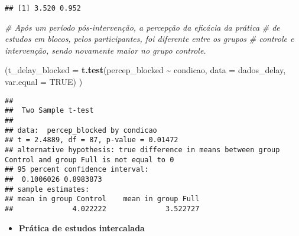 \documentclass[
]{article}
\newenvironment{Shaded}{\begin{snugshade}}{\end{snugshade}}
\newcommand{\AttributeTok}[1]{\textcolor[rgb]{0.13,0.29,0.53}{#1}}
\newcommand{\CommentTok}[1]{\textcolor[rgb]{0.56,0.35,0.01}{\textit{#1}}}
\newcommand{\ConstantTok}[1]{\textcolor[rgb]{0.56,0.35,0.01}{#1}}
\newcommand{\DecValTok}[1]{\textcolor[rgb]{0.00,0.00,0.81}{#1}}
\newcommand{\FunctionTok}[1]{\textcolor[rgb]{0.13,0.29,0.53}{\textbf{#1}}}
\newcommand{\NormalTok}[1]{#1}
\newcommand{\OtherTok}[1]{\textcolor[rgb]{0.56,0.35,0.01}{#1}}
\newcommand{\SpecialCharTok}[1]{\textcolor[rgb]{0.81,0.36,0.00}{\textbf{#1}}}
\newcommand{\StringTok}[1]{\textcolor[rgb]{0.31,0.60,0.02}{#1}}
\providecommand{\tightlist}{%
  \setlength{\itemsep}{0pt}\setlength{\parskip}{0pt}}
\begin{document}
\begin{verbatim}
## [1] 3.520 0.952
\end{verbatim}

\begin{Shaded}
\begin{Highlighting}[]
\CommentTok{\# Após um período pós{-}intervenção, a percepção da eficácia da prática}
\CommentTok{\# de estudos em blocos, pelos participantes, foi diferente entre os grupos}
\CommentTok{\# controle e intervenção, sendo novamente maior no grupo controle.}

\NormalTok{(}\AttributeTok{t\_delay\_blocked =} \FunctionTok{t.test}\NormalTok{(percep\_blocked }\SpecialCharTok{\textasciitilde{}}\NormalTok{ condicao,}
                          \AttributeTok{data =}\NormalTok{ dados\_delay, }\AttributeTok{var.equal =} \ConstantTok{TRUE}\NormalTok{) )}
\end{Highlighting}
\end{Shaded}

\begin{verbatim}
## 
##  Two Sample t-test
## 
## data:  percep_blocked by condicao
## t = 2.4889, df = 87, p-value = 0.01472
## alternative hypothesis: true difference in means between group Control and group Full is not equal to 0
## 95 percent confidence interval:
##  0.1006026 0.8983873
## sample estimates:
## mean in group Control    mean in group Full 
##              4.022222              3.522727
\end{verbatim}

\begin{itemize}
\tightlist
\item
  \textbf{Prática de estudos intercalada}
\end{itemize}

\begin{Shaded}
\end{Shaded}
\end{document}
